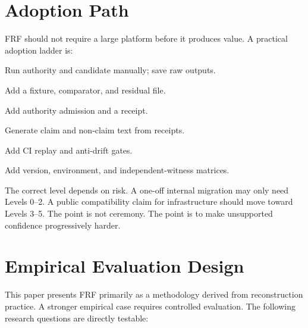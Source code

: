 \documentclass[11pt,a4paper]{article}
\newcommand{\frf}{\textsc{FRF}}
\begin{document}
\section{Adoption Path}
\label{sec:adoption}

\frf{} should not require a large platform before it produces value. A practical adoption ladder is:

\begin{description}[leftmargin=1.7cm,style=nextline]
\item[Level 0.] Run authority and candidate manually; save raw outputs.
\item[Level 1.] Add a fixture, comparator, and residual file.
\item[Level 2.] Add authority admission and a receipt.
\item[Level 3.] Generate claim and non-claim text from receipts.
\item[Level 4.] Add CI replay and anti-drift gates.
\item[Level 5.] Add version, environment, and independent-witness matrices.
\end{description}

The correct level depends on risk. A one-off internal migration may only need Levels 0--2. A public compatibility claim for infrastructure should move toward Levels 3--5. The point is not ceremony. The point is to make unsupported confidence progressively harder.

\section{Empirical Evaluation Design}
\label{sec:research-questions}

This paper presents \frf{} primarily as a methodology derived from reconstruction practice. A stronger empirical case requires controlled evaluation. The following research questions are directly testable:
\end{document}
